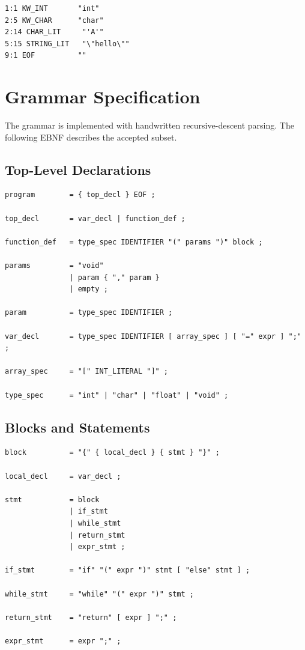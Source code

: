 \documentclass[11pt,a4paper]{article}
\begin{document}
\begin{lstlisting}
1:1 KW_INT       "int"
2:5 KW_CHAR      "char"
2:14 CHAR_LIT     "'A'"
5:15 STRING_LIT   "\"hello\""
9:1 EOF          ""
\end{lstlisting}

\section{Grammar Specification}

The grammar is implemented with handwritten recursive-descent parsing. The
following EBNF describes the accepted subset.

\subsection*{Top-Level Declarations}

\begin{lstlisting}[language=ebnf]
program        = { top_decl } EOF ;

top_decl       = var_decl | function_def ;

function_def   = type_spec IDENTIFIER "(" params ")" block ;

params         = "void"
               | param { "," param }
               | empty ;

param          = type_spec IDENTIFIER ;

var_decl       = type_spec IDENTIFIER [ array_spec ] [ "=" expr ] ";" ;

array_spec     = "[" INT_LITERAL "]" ;

type_spec      = "int" | "char" | "float" | "void" ;
\end{lstlisting}

\subsection*{Blocks and Statements}

\begin{lstlisting}[language=ebnf]
block          = "{" { local_decl } { stmt } "}" ;

local_decl     = var_decl ;

stmt           = block
               | if_stmt
               | while_stmt
               | return_stmt
               | expr_stmt ;

if_stmt        = "if" "(" expr ")" stmt [ "else" stmt ] ;

while_stmt     = "while" "(" expr ")" stmt ;

return_stmt    = "return" [ expr ] ";" ;

expr_stmt      = expr ";" ;
\end{lstlisting}
\end{document}
